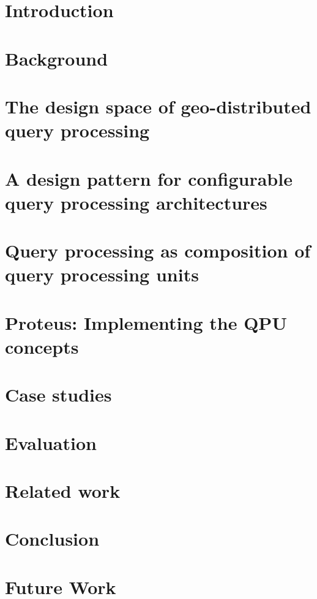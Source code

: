 \chapter{Introduction}
\label{ch:intro}


\chapter{Background}
\label{ch:background}


\chapter{The design space of geo-distributed query processing}
\label{ch:design_space}


\chapter{A design pattern for configurable query processing architectures}
\label{ch:design_pattern}


\chapter{Query processing as composition of query processing units}
\label{ch:composition}


\chapter{Proteus: Implementing the QPU concepts}
\label{ch:proteus}


\chapter{Case studies}
\label{ch:case_studies}


\chapter{Evaluation}
\label{ch:evaluation}


\chapter{Related work}
\label{ch:related_work}


\chapter{Conclusion}
\label{ch:conclusion}


\chapter{Future Work}
\label{ch:future_work}

